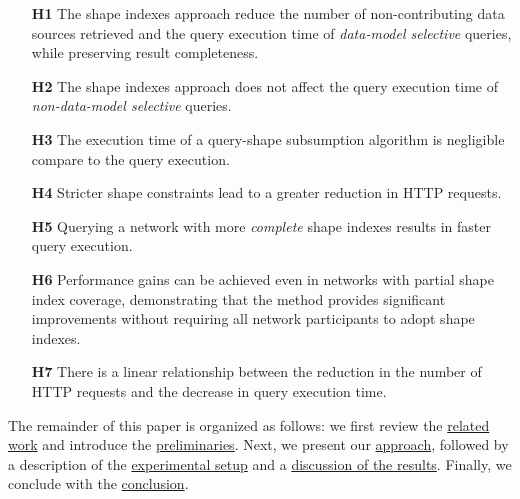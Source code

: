 \begin{itemize}
    \item[\textbf{H1}] The shape indexes approach reduce the number of non-contributing data sources retrieved and the query execution time of \emph{data-model selective} queries, while preserving result completeness.
    \item[\textbf{H2}] The shape indexes approach does not affect the query execution time of \emph{non-data-model selective} queries.
    \item[\textbf{H3}] The execution time of a query-shape subsumption algorithm is negligible compare to the query execution.
    \item[\textbf{H4}] Stricter shape constraints lead to a greater reduction in HTTP requests.
    \item[\textbf{H5}] Querying a network with more \emph{complete} shape indexes results in faster query execution.
    \item[\textbf{H6}] Performance gains can be achieved even in networks with partial shape index coverage, demonstrating that the method provides significant improvements without requiring all network participants to adopt shape indexes.
    \item[\textbf{H7}] There is a linear relationship between the reduction in the number of HTTP requests and the decrease in query execution time.
\end{itemize}

The remainder of this paper is organized as follows: 
we first review the \hyperref[sec:related_work]{related work} and introduce the \hyperref[sec:preliminaries]{preliminaries}. 
Next, we present our \hyperref[sec:approach]{approach}, followed by a description of the \hyperref[sec:experiment]{experimental setup} and a \hyperref[sec:result]{discussion of the results}. 
Finally, we conclude with the \hyperref[sec:conclusion]{conclusion}.
